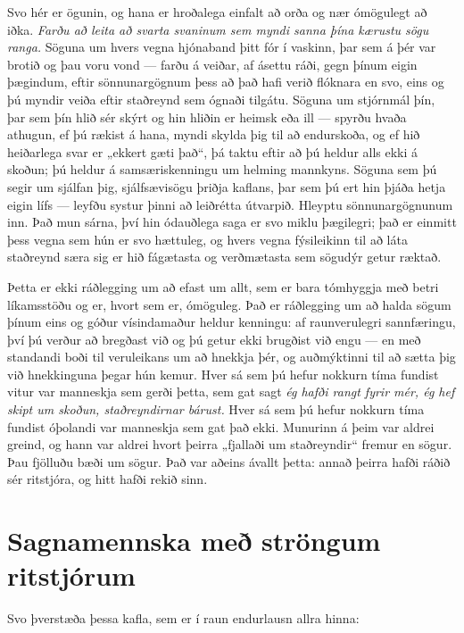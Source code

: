 Svo hér er ögunin, og hana er hroðalega einfalt að orða og nær ómögulegt að iðka. \emph{Farðu að leita að svarta svaninum sem myndi sanna þína kærustu sögu ranga.} Söguna um hvers vegna hjónaband þitt fór í vaskinn, þar sem á þér var brotið og þau voru vond — farðu á veiðar, af ásettu ráði, gegn þínum eigin þægindum, eftir sönnunargögnum þess að það hafi verið flóknara en svo, eins og þú myndir veiða eftir staðreynd sem ógnaði tilgátu. Söguna um stjórnmál þín, þar sem þín hlið sér skýrt og hin hliðin er heimsk eða ill — spyrðu hvaða athugun, ef þú rækist á hana, myndi skylda þig til að endurskoða, og ef hið heiðarlega svar er „ekkert gæti það“, þá taktu eftir að þú heldur alls ekki á skoðun; þú heldur á samsæriskenningu um helming mannkyns. Söguna sem þú segir um sjálfan þig, sjálfsævisögu þriðja kaflans, þar sem þú ert hin þjáða hetja eigin lífs — leyfðu systur þinni að leiðrétta útvarpið. Hleyptu sönnunargögnunum inn. Það mun sárna, því hin ódauðlega saga er svo miklu þægilegri; það er einmitt þess vegna sem hún er svo hættuleg, og hvers vegna fýsileikinn til að láta staðreynd særa sig er hið fágætasta og verðmætasta sem sögudýr getur ræktað.

Þetta er ekki ráðlegging um að efast um allt, sem er bara tómhyggja með betri líkamsstöðu og er, hvort sem er, ómöguleg. Það er ráðlegging um að halda sögum þínum eins og góður vísindamaður heldur kenningu: af raunverulegri sannfæringu, því þú verður að bregðast við og þú getur ekki brugðist við engu — en með standandi boði til veruleikans um að hnekkja þér, og auðmýktinni til að sætta þig við hnekkinguna þegar hún kemur. Hver sá sem þú hefur nokkurn tíma fundist vitur var manneskja sem gerði þetta, sem gat sagt \emph{ég hafði rangt fyrir mér, ég hef skipt um skoðun, staðreyndirnar bárust.} Hver sá sem þú hefur nokkurn tíma fundist óþolandi var manneskja sem gat það ekki. Munurinn á þeim var aldrei greind, og hann var aldrei hvort þeirra „fjallaði um staðreyndir“ fremur en sögur. Þau fjölluðu bæði um sögur. Það var aðeins ávallt þetta: annað þeirra hafði ráðið sér ritstjóra, og hitt hafði rekið sinn.

\section*{Sagnamennska með ströngum ritstjórum}

Svo þverstæða þessa kafla, sem er í raun endurlausn allra hinna:

